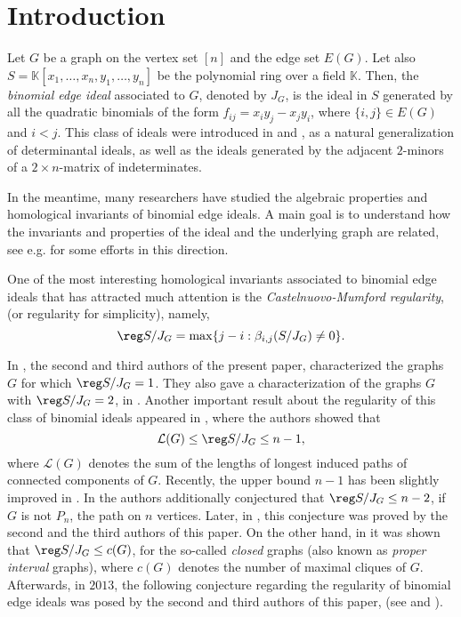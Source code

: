 \documentclass[12pt]{amsart}
\def\KK{{\mathbb K}}
\begin{document}
\section{Introduction}\label{introduction}
	Let $G$ be a graph on the vertex set $[n]$ and the edge set $E(G)$. Let also $S=\KK[x_1 ,\ldots ,x_n , y_1 , \ldots , y_n]$ be the polynomial ring over a field $\KK$. Then, the \emph{binomial edge ideal} associated to $G$, denoted by $J_G$, is the ideal in $S$ generated by all the quadratic binomials of the form $f_{ij}=x_{i}y_{j}-x_{j}y_{i}$, where $\{i,j\}\in E(G)$ and $i<j$. This class of ideals were introduced in \cite{HHHKR} and \cite{O}, as a natural generalization of determinantal ideals, as well as the ideals generated by the adjacent $2$-minors of a $2\times n$-matrix of indeterminates.
\par In the meantime, many researchers have studied the algebraic properties and homological invariants of binomial edge ideals. A main goal is to understand how the invariants and properties of the ideal and the underlying graph are related, see e.g. \cite{A, BN, BMS, EHH, ERT, EZ, KS2, KumarS, MM, RSK2, SK, SK1, SK2} for some efforts in this direction.
\par One of the most interesting homological invariants associated to binomial edge ideals that has attracted much attention is the \emph{Castelnuovo-Mumford regularity}, (or regularity for simplicity), namely,
\[
\reg S/J_G=\max \{j-i: \beta_{i,j}(S/J_G)\neq 0\}.
\] 
\par In \cite{SK}, the second and third authors of the present paper,   characterized the graphs $G$ for which $\reg S/J_G=1$. They also gave a characterization of the graphs $G$ with $\reg S/J_G=2$, in \cite{SK2}. Another important result about the regularity of this class of binomial ideals appeared in \cite{MM}, where the authors showed that 
$$\mathcal{L}(G)\leq \reg S/J_G\leq n-1,$$
where $\mathcal{L}(G)$ denotes the sum of the lengths of longest induced paths of connected components of $G$. Recently, the upper bound $n-1$ has been slightly improved in \cite{ERT}. In \cite{MM} the authors additionally conjectured that $\reg S/J_G\leq n-2$, if $G$ is not $P_n$, the path on $n$ vertices.  Later, in \cite{KS2}, this conjecture was proved by the second and the third authors of this paper. On the other hand, in \cite{SK} it was shown that $\reg S/J_G\leq c(G)$, for the so-called \emph{closed} graphs (also known as \emph{proper interval} graphs), where $c(G)$ denotes the number of maximal cliques of $G$. Afterwards, in $2013$, the following conjecture regarding the regularity of binomial edge ideals was posed by the second and third authors of this paper, (see \cite[page~12]{SK1} and  \cite[Conjecture~A]{KS2}).
\end{document}
